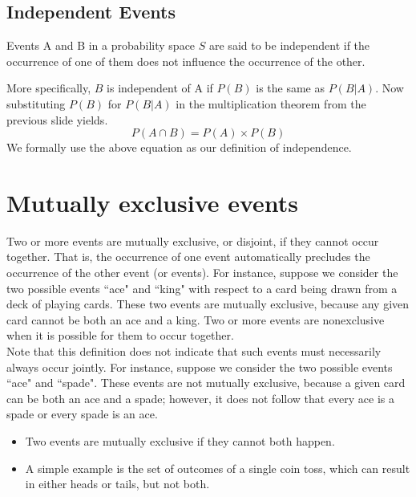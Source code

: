 \documentclass[]{report}
\begin{document}
{

\subsection{Independent Events}
Events A and B in a probability space $S$ are said to be independent if the
occurrence of one of them does not influence the occurrence of the other.\\ \bigskip

More specifically, $B$ is independent of A if $P(B)$ is the same as $P(B|A)$. Now
substituting $P(B)$ for $P(B|A)$ in the multiplication theorem from the previous
slide yields.
\[ P(A\cap B) = P(A)\times P(B)\]
We formally use the above equation as our definition of independence.

}
\section{Mutually exclusive events}
Two or more events are mutually exclusive, or disjoint, if they cannot occur together. That is, the occurrence
of one event automatically precludes the occurrence of the other event (or events). For instance, suppose we
consider the two possible events ``ace" and ``king" with respect to a card being drawn from a deck of playing
cards. These two events are mutually exclusive, because any given card cannot be both an ace and a king.
Two or more events are nonexclusive when it is possible for them to occur together. 
\\
Note that this definition does not indicate that such events must necessarily always occur jointly. For instance, suppose we consider the two possible events ``ace" and ``spade". These events are not mutually exclusive, because a given card can be both an ace and a spade; however, it does not follow that every ace is a spade or every spade is an ace.



\begin{itemize}
\item Two events are mutually exclusive if they cannot both happen. 
\item A simple example is the set of outcomes of a single coin toss, which can result in either heads or tails, but not both.
\end{itemize}
\end{document}
